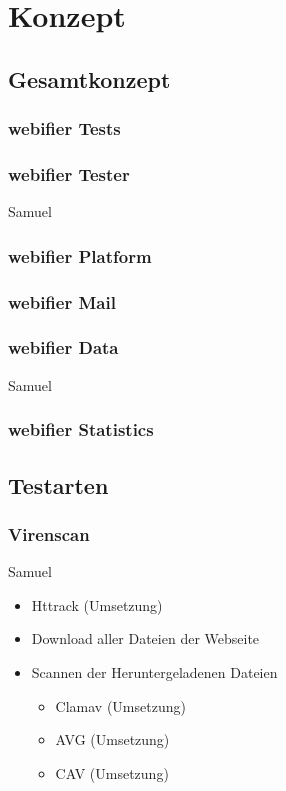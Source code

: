 \chapter{Konzept}

\section{Gesamtkonzept}

\subsection{webifier Tests}

\subsection{webifier Tester}

\todo Samuel

\subsection{webifier Platform}

\subsection{webifier Mail}

\subsection{webifier Data}

\todo Samuel

\subsection{webifier Statistics}

\section{Testarten}

\subsection{Virenscan}

\todo Samuel

\begin{itemize}
  \item Httrack (Umsetzung)
  \item Download aller Dateien der Webseite
  \item Scannen der Heruntergeladenen Dateien
  \begin{itemize}
    \item Clamav (Umsetzung)
    \item AVG (Umsetzung)
    \item CAV (Umsetzung)
  \end{itemize}
\end{itemize}

